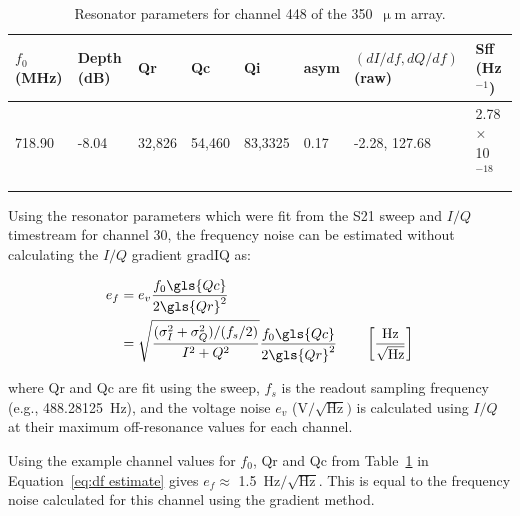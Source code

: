 \begin{figure}[ptbh]
\label{fig:example chan}
\end{figure}

\begin{table}[!htbp]
\centering
\begin{tabular}{@{}llllllll@{}}
\dtoprule
$f_{0}$ (MHz)   & Depth (dB) & \gls{Qr} & \gls{Qc} & \gls{Qi} & \gls{asym} & $(dI/df, dQ/df)$ (raw)  & \gls{Sff} (Hz$^{-1}$) \\ \midrule
718.90         & -8.04      & 32,826   & 54,460    & 83,3325   & 0.17  & -2.28, 127.68      & 2.78 $\times$ 10$^{-18}$    \\ \dbottomrule
\\
\end{tabular}
\caption[~Resonator parameters for channel 448 of the  array.]{Resonator parameters for channel 448 of the 350~$\upmu$m array.}
\label{table:350 example chan}
\end{table}

Using the resonator parameters which were fit from the \gls{S21} sweep and $I/Q$ timestream for channel 30, the frequency noise can be estimated without calculating the $I/Q$ gradient \gls{gradIQ} as:

\begin{equation}\label{eq:df estimate}
  \begin{aligned}
  e_{f} &= e_{v} \frac{f_{0} \gls{Qc} }{2 \gls{Qr}^{2}}\\
        &= \sqrt{ \frac{ (\sigma^{2}_{I} + \sigma^{2}_{Q}) / (f_{s}/2)}{ I^{2} + Q^{2} } } \frac{f_{0} \gls{Qc} }{2 \gls{Qr}^{2}} \qquad \left[  \frac{ \text{Hz} }{ \sqrt{\mathrm{Hz}} } \right]
  \end{aligned}
\end{equation}

where \gls{Qr} and \gls{Qc} are fit using the sweep, $f_{s}$ is the readout sampling frequency (e.g., 488.28125~Hz), and the voltage noise $e_{v}$ ($\mathrm{V}/\sqrt{\mathrm{Hz}})$ is calculated using $I/Q$ at their maximum off-resonance values for each channel.

Using the example channel values for $f_{0}$, \gls{Qr} and \gls{Qc} from Table~\ref{table:350 example chan} in Equation~\ref{eq:df estimate} gives $e_{f} \approx$ 1.5~$\mathrm{Hz}/\sqrt{\mathrm{Hz}}$. This is equal to the frequency noise calculated for this channel using the gradient method.


